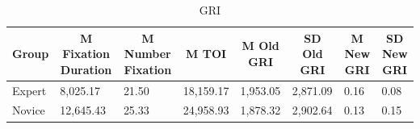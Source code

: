 \documentclass[
  english,
  man,floatsintext]{apa6}
\begin{document}
\begin{table}[h]
\begin{center}
\begin{threeparttable}
{}

\end{threeparttable}
\end{center}

\end{table}

\begin{table}[h]

\begin{center}
\begin{threeparttable}

\caption{\label{tab:GRItable3}GRI}

\tiny{

\begin{tabular}{llllllll}
\toprule
Group & \multicolumn{1}{c}{M Fixation Duration} & \multicolumn{1}{c}{M Number Fixation} & \multicolumn{1}{c}{M TOI} & \multicolumn{1}{c}{M Old GRI} & \multicolumn{1}{c}{SD Old GRI} & \multicolumn{1}{c}{M New GRI} & \multicolumn{1}{c}{SD New GRI}\\
\midrule
Expert & 8,025.17 & 21.50 & 18,159.17 & 1,953.05 & 2,871.09 & 0.16 & 0.08\\
Novice & 12,645.43 & 25.33 & 24,958.93 & 1,878.32 & 2,902.64 & 0.13 & 0.15\\
\bottomrule
\end{tabular}

}

\end{threeparttable}
\end{center}

\end{table}
\end{document}
